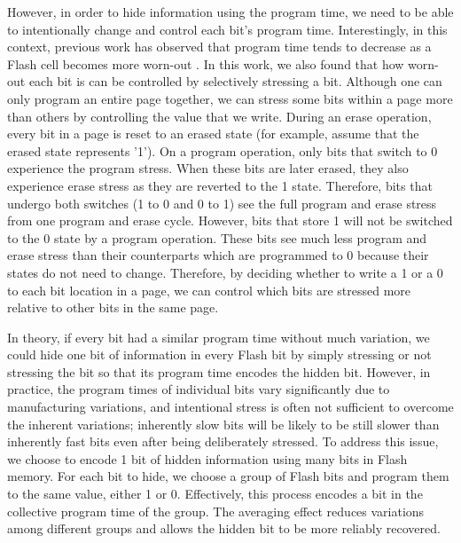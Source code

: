 However, in order to hide information using the program time, we need to be able to 
intentionally change and control each bit's program time. Interestingly, in this
context, previous work has observed that program time tends to decrease as a Flash cell
becomes more worn-out \cite{grupp2009, trust2011}.
In this work, we also found that how worn-out each bit is can be controlled
by selectively stressing a bit.
Although one can only program an entire page together, we can stress some bits
within a page more than others by controlling the value that we write.
During an erase operation, every bit
in a page is reset to an erased state (for example, assume that the erased state
represents '1').
On a program operation, only bits that switch to 0 experience
the program stress. When these bits are later erased, they also experience erase stress
as they are reverted to the 1 state. Therefore, bits that undergo
both switches (1 to 0 and 0 to 1) see the full program and erase stress
from one program and erase cycle. However, bits that store 1 will not be
switched to the 0 state by a program operation.
These bits see much less program and erase stress than their counterparts
which are programmed to 0 because their states do not need to change.
Therefore, by deciding whether to write a 1 or a 0 to each bit location 
in a page, we can control which bits are stressed more relative to 
other bits in the same page. 

In theory, if every bit had a similar program time without much variation,
we could hide one bit of information in every Flash bit by simply stressing or not
stressing the bit so that its program time encodes the hidden bit.
However, in practice, the program times of individual bits vary significantly
due to manufacturing variations, and intentional stress is often not sufficient 
to overcome the inherent variations; inherently slow bits will be likely to be
still slower than inherently fast bits even after being deliberately stressed.
To address this issue, we choose to encode 1 bit of hidden information %
using many bits in Flash memory. %
For each bit to hide, we choose a group of Flash bits and program them to the
same value, either 1 or 0. Effectively, this process encodes a bit in the collective
program time of the group. The averaging effect reduces variations among different
groups and allows the hidden bit to be more reliably recovered.

